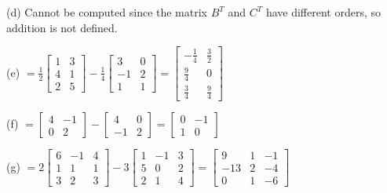 \documentclass[addpoints]{exam}
\begin{document}
\begin{sloppypar}
\begin{questions}
\begin{solution}
        (d) Cannot be computed since the matrix $ B^T $ and $ C^T $ have different orders, so addition is not defined.

        (e) $ = \frac{1}{2}\begin{bmatrix}
            1 & 3 \\ 4 & 1 \\ 2 & 5
        \end{bmatrix} -\frac{1}{4}\begin{bmatrix}
            3 & 0 \\ -1 & 2 \\ 1 & 1
        \end{bmatrix} = \begin{bmatrix}
            -\frac{1}{4} & \frac{3}{2} \\ 
            \frac{9}{4} & 0 \\ \frac{3}{4} & \frac{9}{4}
        \end{bmatrix}$

        (f) $ = \begin{bmatrix}
            4 & -1 \\ 0 & 2
        \end{bmatrix} - \begin{bmatrix}
            4 & 0 \\ -1 & 2
        \end{bmatrix} = \begin{bmatrix}
            0 & -1 \\ 1 & 0
        \end{bmatrix}$

        (g) $ = 2\begin{bmatrix}
            6 & -1 & 4 \\ 1 & 1 & 1 \\ 3 & 2 & 3
        \end{bmatrix} - 3\begin{bmatrix}
            1 & -1 & 3 \\ 5 & 0 & 2 \\ 2 & 1 & 4
        \end{bmatrix} = \begin{bmatrix}
            9 & 1 & -1 \\ 
            -13 & 2 & -4 \\ 
            0 & 1 & -6
        \end{bmatrix}$


\end{solution}
\end{questions}
\end{sloppypar}
\end{document}
